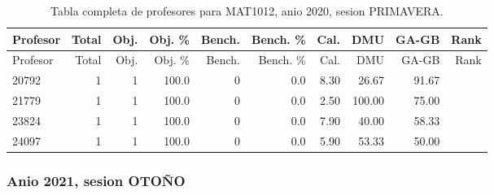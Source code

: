 \begingroup
\scriptsize
\setlength{\tabcolsep}{3pt}
\begin{longtable}{lrrrrrrrrr}
\caption{Tabla completa de profesores para MAT1012, anio 2020, sesion PRIMAVERA.}\label{tab:prof-period-mat1012-2020-primavera-especializado}\\
\toprule
Profesor & Total & Obj. & Obj. \% & Bench. & Bench. \% & Cal. & DMU & GA-GB & Rank \\
\midrule
\endfirsthead
\toprule
Profesor & Total & Obj. & Obj. \% & Bench. & Bench. \% & Cal. & DMU & GA-GB & Rank \\
\midrule
\endhead
20792 & 1 & 1 & 100.0 & 0 & 0.0 & 8.30 & 26.67 & 91.67 &  \\
21779 & 1 & 1 & 100.0 & 0 & 0.0 & 2.50 & 100.00 & 75.00 &  \\
23824 & 1 & 1 & 100.0 & 0 & 0.0 & 7.90 & 40.00 & 58.33 &  \\
24097 & 1 & 1 & 100.0 & 0 & 0.0 & 5.90 & 53.33 & 50.00 &  \\
\bottomrule
\end{longtable}
\endgroup

\subsubsection{Anio 2021, sesion OTOÑO}

